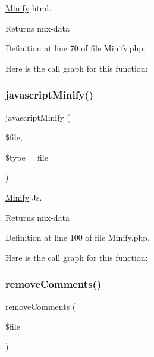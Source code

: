 \mbox{\hyperlink{class_zest_1_1_common_1_1_minify}{Minify}} html.

\begin{DoxyReturn}{Returns}
mix-\/data 
\end{DoxyReturn}


Definition at line 70 of file Minify.\+php.

Here is the call graph for this function\+:
\mbox{\label{class_zest_1_1_common_1_1_minify_a698373ad4b0e533c71c28fd61660f46c}} 
\subsubsection{\texorpdfstring{javascript\+Minify()}{javascriptMinify()}}
{\footnotesize\ttfamily javascript\+Minify (\begin{DoxyParamCaption}\item[{}]{\$file,  }\item[{}]{\$type = {\ttfamily \textquotesingle{}file\textquotesingle{}} }\end{DoxyParamCaption})}

\mbox{\hyperlink{class_zest_1_1_common_1_1_minify}{Minify}} Js.

\begin{DoxyReturn}{Returns}
mix-\/data 
\end{DoxyReturn}


Definition at line 100 of file Minify.\+php.

Here is the call graph for this function\+:
\mbox{\label{class_zest_1_1_common_1_1_minify_a009e6f00f6b6f4c1b355e489541ca339}} 
\subsubsection{\texorpdfstring{remove\+Comments()}{removeComments()}}
{\footnotesize\ttfamily remove\+Comments (\begin{DoxyParamCaption}\item[{}]{\$file }\end{DoxyParamCaption})}

